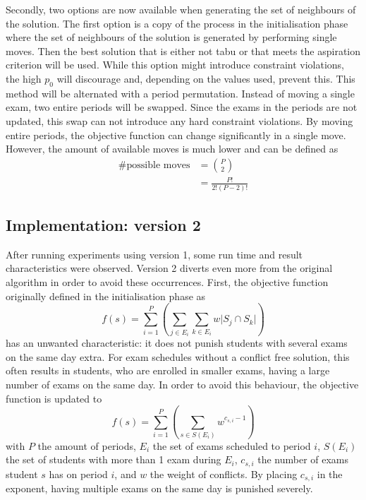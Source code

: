 Secondly, two options are now available when generating the set of neighbours of the solution. The first option is a copy of the process in the initialisation phase where the set of neighbours of the solution is generated by performing single moves. Then the best solution that is either not tabu or that meets the aspiration criterion will be used. While this option might introduce constraint violations, the high $p_0$ will discourage and, depending on the values used, prevent this. This method will be alternated with a period permutation. Instead of moving a single exam, two entire periods will be swapped. Since the exams in the periods are not updated, this swap can not introduce any hard constraint violations. By moving entire periods, the objective function can change significantly in a single move. However, the amount of available moves is much lower and can be defined as
\begin{equation}
\begin{split}
   \text{\# possible moves}  & = \binom{P}{2}   \\
   & = \frac{P!}{2!(P-2)!}
\end{split}
\end{equation}

\subsection{Implementation: version 2}

After running experiments using version 1, some run time and result characteristics were observed. Version 2 diverts even more from the original algorithm in order to avoid these occurrences. First, the objective function originally defined in the initialisation phase as   
\begin{equation}
    f(s) = \sum_{i=1}^{P} \left( \sum_{j \in E_i}^{}\sum_{k \in E_i}^{}w \lvert S_j \cap S_k \rvert \right)
\end{equation}
has an unwanted characteristic: it does not punish students with several exams on the same day extra. For exam schedules without a conflict free solution, this often results in students, who are enrolled in smaller exams, having a large number of exams on the same day. In order to avoid this behaviour, the objective function is updated to
\begin{equation}
    f(s) = \sum_{i=1}^{P} ( \sum_{s \in S(E_i)}^{}w^{c_{s,i} - 1})
\end{equation}
with $P$ the amount of periods, $E_i$ the set of exams scheduled to period $i$, $S(E_i)$ the set of students with more than 1 exam during $E_i$, $c_{s,i}$ the number of exams student $s$ has on period $i$, and $w$ the weight of conflicts. By placing $c_{s,i}$ in the exponent, having multiple exams on the same day is punished severely. 

